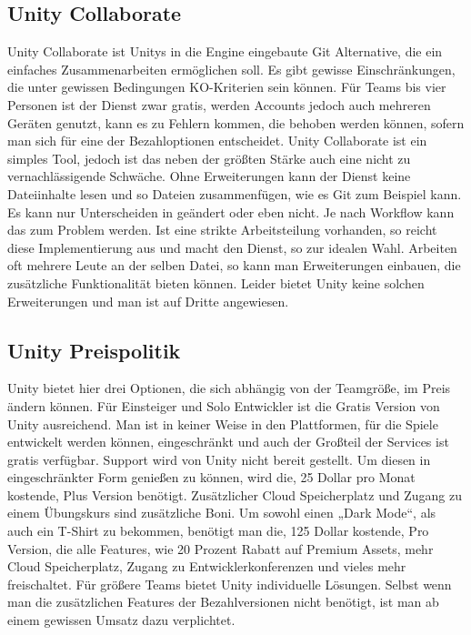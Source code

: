 \subsection{Unity Collaborate}
Unity Collaborate ist Unitys in die Engine eingebaute Git Alternative, die ein einfaches Zusammenarbeiten ermöglichen soll. Es gibt gewisse Einschränkungen, die unter gewissen Bedingungen KO-Kriterien sein können. Für Teams bis vier Personen ist der Dienst zwar gratis, werden Accounts jedoch auch mehreren Geräten genutzt, kann es zu Fehlern kommen, die behoben werden können, sofern man sich für eine der Bezahloptionen entscheidet. Unity Collaborate ist ein simples Tool, jedoch ist das neben der größten Stärke auch eine nicht zu vernachlässigende Schwäche. Ohne Erweiterungen kann der Dienst keine Dateiinhalte lesen und so Dateien zusammenfügen, wie es Git zum Beispiel kann. Es kann nur Unterscheiden in geändert oder eben nicht. Je nach Workflow kann das zum Problem werden. Ist eine strikte Arbeitsteilung vorhanden, so reicht diese Implementierung aus und macht den Dienst, so zur idealen Wahl. Arbeiten oft mehrere Leute an der selben Datei, so kann man Erweiterungen einbauen, die zusätzliche Funktionalität bieten können. Leider bietet Unity keine solchen Erweiterungen und man ist auf Dritte angewiesen.

\subsection{Unity Preispolitik}
Unity bietet hier drei Optionen, die sich abhängig von der Teamgröße, im Preis ändern können. Für Einsteiger und Solo Entwickler ist die Gratis Version von Unity ausreichend. Man ist in keiner Weise in den Plattformen, für die Spiele entwickelt werden können, eingeschränkt und auch der Großteil der Services ist gratis verfügbar. Support wird von Unity nicht bereit gestellt. Um diesen in eingeschränkter Form genießen zu können, wird die, 25 Dollar pro Monat kostende, Plus Version benötigt. Zusätzlicher Cloud Speicherplatz und Zugang zu einem Übungskurs sind zusätzliche Boni. Um sowohl einen „Dark Mode“, als auch ein T-Shirt zu bekommen, benötigt man die, 125 Dollar kostende, Pro Version, die alle Features, wie 20 Prozent Rabatt auf Premium Assets, mehr Cloud Speicherplatz, Zugang zu Entwicklerkonferenzen und vieles mehr freischaltet. Für größere Teams bietet Unity individuelle Lösungen. Selbst wenn man die zusätzlichen Features der Bezahlversionen nicht benötigt, ist man ab einem gewissen Umsatz dazu verplichtet.

